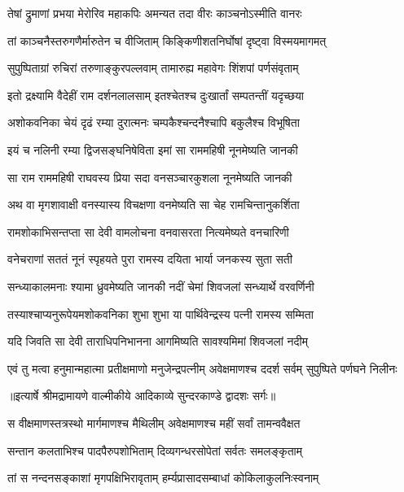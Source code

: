 \twolineshloka
{तेषां द्रुमाणां प्रभया मेरोरिव महाकपिः}
{अमन्यत तदा वीरः काञ्चनोऽस्मीति वानरः} %

\twolineshloka
{तां काञ्चनैस्तरुगणैर्मारुतेन च वीजिताम्}
{किङ्किणीशतनिर्घोषां दृष्ट्वा विस्मयमागमत्} %

\twolineshloka
{सुपुष्पिताग्रां रुचिरां तरुणाङ्कुरपल्लवाम्}
{तामारुह्य महावेगः शिंशपां पर्णसंवृताम्} %

\twolineshloka
{इतो द्रक्ष्यामि वैदेहीं राम दर्शनलालसाम्}
{इतश्चेतश्च दुःखार्तां सम्पतन्तीं यदृच्छया} %

\twolineshloka
{अशोकवनिका चेयं दृढं रम्या दुरात्मनः}
{चम्पकैश्चन्दनैश्चापि बकुलैश्च विभूषिता} %

\twolineshloka
{इयं च नलिनी रम्या द्विजसङ्घनिषेविता}
{इमां सा राममहिषी नूनमेष्यति जानकी} %

\twolineshloka
{सा राम राममहिषी राघवस्य प्रिया सदा}
{वनसञ्चारकुशला नूनमेष्यति जानकी} %

\twolineshloka
{अथ वा मृगशावाक्षी वनस्यास्य विचक्षणा}
{वनमेष्यति सा चेह रामचिन्तानुकर्शिता} %

\twolineshloka
{रामशोकाभिसन्तप्ता सा देवी वामलोचना}
{वनवासरता नित्यमेष्यते वनचारिणी} %

\twolineshloka
{वनेचराणां सततं नूनं स्पृहयते पुरा}
{रामस्य दयिता भार्या जनकस्य सुता सती} %

\twolineshloka
{सन्ध्याकालमनाः श्यामा ध्रुवमेष्यति जानकी}
{नदीं चेमां शिवजलां सन्ध्यार्थे वरवर्णिनी} %

\twolineshloka
{तस्याश्चाप्यनुरूपेयमशोकवनिका शुभा}
{शुभा या पार्थिवेन्द्रस्य पत्नी रामस्य सम्मिता} %

\twolineshloka
{यदि जिवति सा देवी ताराधिपनिभानना}
{आगमिष्यति सावश्यमिमां शिवजलां नदीम्} %

\fourlineindentedshloka
{एवं तु मत्वा हनुमान्महात्मा}
{प्रतीक्षमाणो मनुजेन्द्रपत्नीम्}
{अवेक्षमाणश्च ददर्श सर्वम्}
{सुपुष्पिते पर्णघने निलीनः} %


{॥इत्यार्षे श्रीमद्रामायणे वाल्मीकीये आदिकाव्ये सुन्दरकाण्डे द्वादशः सर्गः॥}


\twolineshloka
{स वीक्षमाणस्तत्रस्थो मार्गमाणश्च मैथिलीम्}
{अवेक्षमाणश्च महीं सर्वां तामन्ववैक्षत} %

\twolineshloka
{सन्तान कलताभिश्च पादपैरुपशोभिताम्}
{दिव्यगन्धरसोपेतां सर्वतः समलङ्कृताम्} %

\twolineshloka
{तां स नन्दनसङ्काशां मृगपक्षिभिरावृताम्}
{हर्म्यप्रासादसम्बाधां कोकिलाकुलनिःस्वनाम्} %


